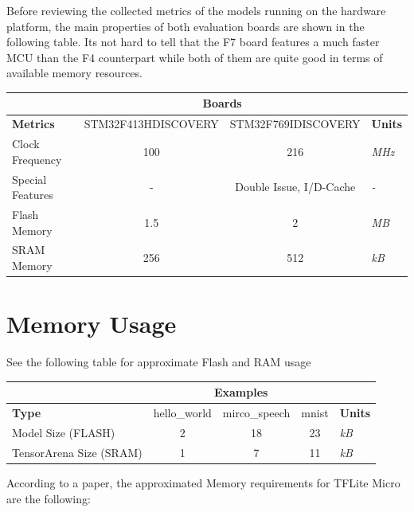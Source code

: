 \documentclass[oneside]{tum-book}
\begin{document}
Before reviewing the collected metrics of the models running on the hardware platform, the main properties of both evaluation boards are shown in the following table. Its not hard to tell that the F7 board features a much faster MCU than the F4 counterpart while both of them are quite good in terms of available memory resources.

\begin{table}[h]
\begin{tabular}{|l|c|c|l|}
\hline
& \multicolumn{2}{c|}{\textbf{Boards}} &\\\hline
\textbf{Metrics} & STM32F413HDISCOVERY & STM32F769IDISCOVERY & \textbf{Units} \\\hline
Clock Frequency   & 100  & 216    & \textit{MHz}         \\
Special Features  & -        & Double Issue, I/D-Cache      & \textit{-}       \\
Flash Memory      & 1.5      & 2      & \textit{MB}          \\
SRAM Memory       & 256                              & 512                              & \textit{kB}    \\\hline
\end{tabular}
\end{table}

\section{Memory Usage}

See the following table for approximate Flash and RAM usage

\begin{table}[h]
\begin{tabular}{|l|c|c|c|l|}
\hline
& \multicolumn{3}{c|}{\textbf{Examples}} &\\\hline
\textbf{Type}                        & hello\_world & mirco\_speech & mnist & \textbf{Units} \\\hline
Model Size (FLASH)                      & 2              & 18              & 23      & \textit{kB}     \\
TensorArena Size (SRAM) & 1              & 7               & 11      & \textit{kB}\\\hline  
\end{tabular}
\end{table}

According to a paper\cite{banbury2020micronets}, the approximated Memory requirements for TFLite Micro are the following:
\end{document}
